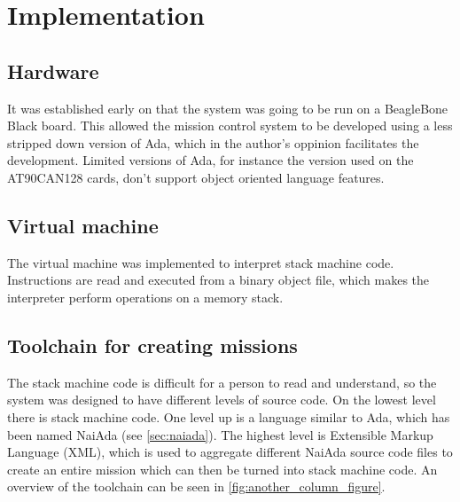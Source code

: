 \section{Implementation}\label{sec:implementation}
\newline
\subsection{Hardware}
It was established early on that the system was going to be run on a BeagleBone Black \cite{web:mcsbbb} board. This allowed the mission control system to be developed using a less stripped down version of Ada, which in the author's oppinion facilitates the development. Limited versions of Ada, for instance the version used on the AT90CAN128 \cite{web:mcsatcan} cards, don't support object oriented language features.

\subsection{Virtual machine}
The virtual machine was implemented to interpret stack machine code. Instructions are read and executed from a binary object file, which makes the interpreter perform operations on
a memory stack.

\subsection{Toolchain for creating missions}
The stack machine code is difficult for a person to read and understand, so the system was designed to have different levels of source code. On the lowest level there is
stack machine code. One level up is a language similar to Ada, which has been named NaiAda (see \cref{sec:naiada}). The highest level is Extensible Markup Language (XML), which is used to aggregate different NaiAda source code files
to create an entire mission which can then be turned into stack machine code. An overview of the toolchain can be seen in \cref{fig:another_column_figure}.

